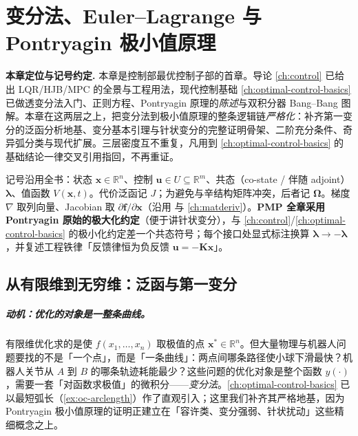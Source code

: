 \chapter{变分法、Euler--Lagrange 与 Pontryagin 极小值原理}
\label{ch:opt-variational-pmp}


\begin{note}
\textbf{本章定位与记号约定.}\;
本章是控制部最优控制子部的首章。导论 \cref{ch:control} 已给出 LQR/HJB/MPC 的全景与工程用法，现代控制基础 \cref{ch:optimal-control-basics} 已做透变分法入门、正则方程、Pontryagin 原理的\emph{陈述}与双积分器 Bang--Bang 图解。本章在这两层之上，把变分法到极小值原理的整条逻辑链\emph{严格化}：补齐第一变分的泛函分析地基、变分基本引理与针状变分的完整证明骨架、二阶充分条件、奇异弧分类与现代扩展。三层密度互不重复，凡用到 \cref{ch:optimal-control-basics} 的基础结论一律交叉引用指回，不再重证。

记号沿用全书：状态 $\mathbf x\in\mathbb R^n$、控制 $\mathbf u\in U\subseteq\mathbb R^m$、共态（co-state / 伴随 adjoint）$\boldsymbol\lambda$、值函数 $V(\mathbf x,t)$。代价泛函记 $J$；为避免与辛结构矩阵冲突，后者记 $\boldsymbol\Omega$。梯度 $\nabla$ 取列向量、Jacobian 取 $\partial\mathbf f/\partial\mathbf x$（沿用  与 \cref{ch:matderiv}）。\textbf{PMP 全章采用 Pontryagin 原始的极大化约定}（便于讲针状变分），与 \cref{ch:control}/\cref{ch:optimal-control-basics} 的极小化约定差一个共态符号；每个接口处显式标注换算 $\boldsymbol\lambda\to-\boldsymbol\lambda$，并复述工程铁律「反馈律恒为负反馈 $\mathbf u=-\mathbf K\mathbf x$」。
\end{note}

\section{从有限维到无穷维：泛函与第一变分}
\label{sec:pmp-functional}

\paragraph{动机：优化的对象是一整条曲线。}
有限维优化求的是使 $f(x_1,\dots,x_n)$ 取极值的点 $\mathbf x^\ast\in\mathbb R^n$。但大量物理与机器人问题要找的不是「一个点」，而是「一条曲线」：两点间哪条路径使小球下滑最快？机器人关节从 $A$ 到 $B$ 的哪条轨迹耗能最少？这些问题的优化对象是整个函数 $y(\cdot)$，需要一套「对函数求极值」的微积分——\emph{变分法}。\cref{ch:optimal-control-basics} 已以最短弧长（\cref{ex:oc-arclength}）作了直观引入；这里我们补齐其严格地基，因为 Pontryagin 极小值原理的证明正建立在「容许类、变分强弱、针状扰动」这些精细概念之上。

